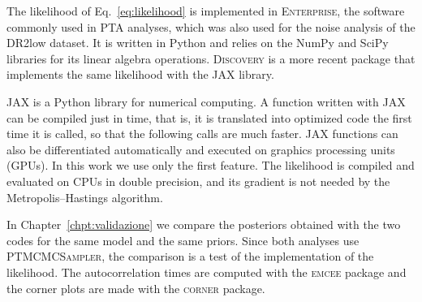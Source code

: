 The likelihood of Eq.~\eqref{eq:likelihood} is implemented in
\textsc{Enterprise}, the software commonly used in PTA analyses, which was
also used for the noise analysis of the DR2low dataset. It is written in
Python and relies on the NumPy and SciPy libraries for its linear algebra
operations. \textsc{Discovery} is a more recent package that implements the
same likelihood with the JAX library.

JAX is a Python library for numerical computing. A function written with JAX
can be compiled just in time, that is, it is translated into optimized code the
first time it is called, so that the following calls are much faster. JAX
functions can also be differentiated automatically and executed on graphics
processing units (GPUs). In this work we use only the first feature. The
likelihood is compiled and evaluated on CPUs in double precision, and its
gradient is not needed by the Metropolis--Hastings algorithm.

In Chapter~\ref{chpt:validazione} we compare the posteriors obtained with the
two codes for the same model and the same priors. Since both analyses use
\textsc{PTMCMCSampler}, the comparison is a test of the implementation of the
likelihood. The autocorrelation times are computed with the \textsc{emcee}
package and the corner plots are made with the \textsc{corner} package.